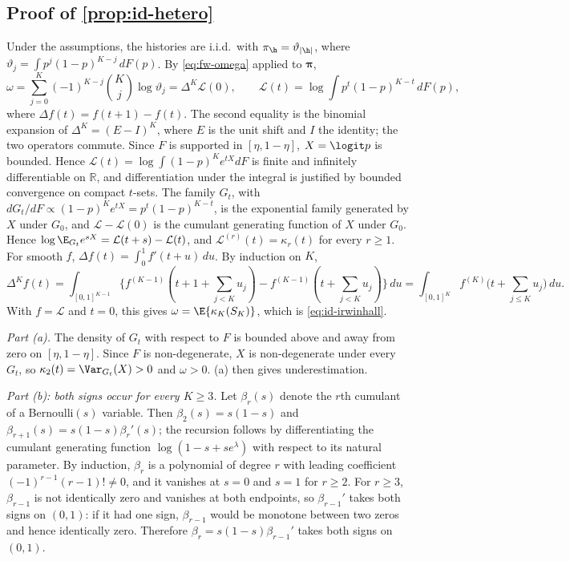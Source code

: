 \subsection{Proof of \texorpdfstring{\cref{prop:id-hetero}}{the heterogeneity proposition}}\label{app:id-hetero}

Under the assumptions, the histories are i.i.d.\ with $\pi_{\h}=\vartheta_{|\h|}$, where $\vartheta_j=\int p^j(1-p)^{K-j}\,dF(p)$. By \eqref{eq:fw-omega} applied to $\bm\pi$,
\[
  \omega=\sum_{j=0}^K(-1)^{K-j}\binom Kj\log\vartheta_j=\Delta^K\mathcal L(0),
  \qquad
  \mathcal L(t)=\log\int p^t(1-p)^{K-t}\,dF(p),
\]
where $\Delta f(t)=f(t+1)-f(t)$. The second equality is the binomial expansion of $\Delta^K=(E-I)^K$, where $E$ is the unit shift and $I$ the identity; the two operators commute. Since $F$ is supported in $[\eta,1-\eta]$, $X=\logit p$ is bounded. Hence $\mathcal L(t)=\log\int(1-p)^Ke^{tX}dF$ is finite and infinitely differentiable on $\mathbb R$, and differentiation under the integral is justified by bounded convergence on compact $t$-sets. The family $G_t$, with $dG_t/dF\propto(1-p)^Ke^{tX}=p^t(1-p)^{K-t}$, is the exponential family generated by $X$ under $G_0$, and $\mathcal L-\mathcal L(0)$ is the cumulant generating function of $X$ under $G_0$. Hence $\log\E_{G_t}e^{sX}=\mathcal L(t+s)-\mathcal L(t)$, and $\mathcal L^{(r)}(t)=\kappa_r(t)$ for every $r\ge1$. For smooth $f$, $\Delta f(t)=\int_0^1f'(t+u)\,du$. By induction on $K$,
\[
  \Delta^Kf(t)=\int_{[0,1]^{K-1}}\bigl\{f^{(K-1)}(t+1+\textstyle\sum_{j<K}u_j)-f^{(K-1)}(t+\sum_{j<K}u_j)\bigr\}\,du
  =\int_{[0,1]^K}f^{(K)}\bigl(t+\textstyle\sum_{j\le K}u_j\bigr)\,du .
\]
With $f=\mathcal L$ and $t=0$, this gives $\omega=\E\{\kappa_K(S_K)\}$, which is \eqref{eq:id-irwinhall}.

\emph{Part (a).} The density of $G_t$ with respect to $F$ is bounded above and away from zero on $[\eta,1-\eta]$. Since $F$ is non-degenerate, $X$ is non-degenerate under every $G_t$, so $\kappa_2(t)=\Var_{G_t}(X)>0$ and $\omega>0$. (a) then gives underestimation.

\emph{Part (b): both signs occur for every $K\ge3$.} Let $\beta_r(s)$ denote the $r$th cumulant of a Bernoulli$(s)$ variable. Then $\beta_2(s)=s(1-s)$ and $\beta_{r+1}(s)=s(1-s)\beta_r'(s)$; the recursion follows by differentiating the cumulant generating function $\log(1-s+se^{\lambda})$ with respect to its natural parameter. By induction, $\beta_r$ is a polynomial of degree $r$ with leading coefficient $(-1)^{r-1}(r-1)!\neq0$, and it vanishes at $s=0$ and $s=1$ for $r\ge2$. For $r\ge3$, $\beta_{r-1}$ is not identically zero and vanishes at both endpoints, so $\beta_{r-1}'$ takes both signs on $(0,1)$: if it had one sign, $\beta_{r-1}$ would be monotone between two zeros and hence identically zero. Therefore $\beta_r=s(1-s)\beta_{r-1}'$ takes both signs on $(0,1)$.

